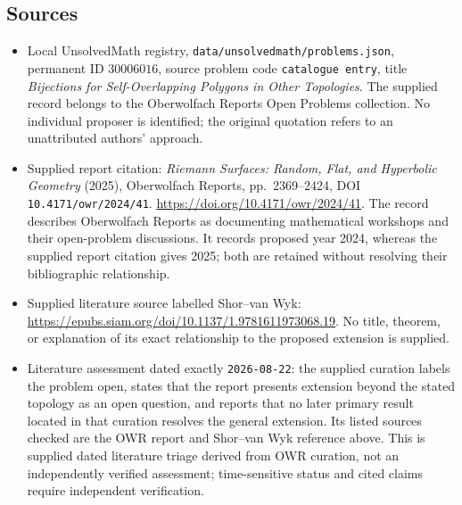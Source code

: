 \documentclass[11pt]{article}
\begin{document}
\subsection{Sources}
\begin{itemize}
\item Local UnsolvedMath registry, \texttt{data/unsolvedmath/problems.json}, permanent ID \(30006016\), source problem code \texttt{catalogue entry}, title \emph{Bijections for Self-Overlapping Polygons in Other Topologies}. The supplied record belongs to the Oberwolfach Reports Open Problems collection. No individual proposer is identified; the original quotation refers to an unattributed authors' approach.
\item Supplied report citation: \emph{Riemann Surfaces: Random, Flat, and Hyperbolic Geometry} (2025), Oberwolfach Reports, pp.~2369--2424, DOI \texttt{10.4171/owr/2024/41}. \url{https://doi.org/10.4171/owr/2024/41}. The record describes Oberwolfach Reports as documenting mathematical workshops and their open-problem discussions. It records proposed year 2024, whereas the supplied report citation gives 2025; both are retained without resolving their bibliographic relationship.
\item Supplied literature source labelled Shor--van Wyk: \url{https://epubs.siam.org/doi/10.1137/1.9781611973068.19}. No title, theorem, or explanation of its exact relationship to the proposed extension is supplied.
\item Literature assessment dated exactly \texttt{2026-08-22}: the supplied curation labels the problem open, states that the report presents extension beyond the stated topology as an open question, and reports that no later primary result located in that curation resolves the general extension. Its listed sources checked are the OWR report and Shor--van Wyk reference above. This is supplied dated literature triage derived from OWR curation, not an independently verified assessment; time-sensitive status and cited claims require independent verification.
\end{itemize}
\end{document}
